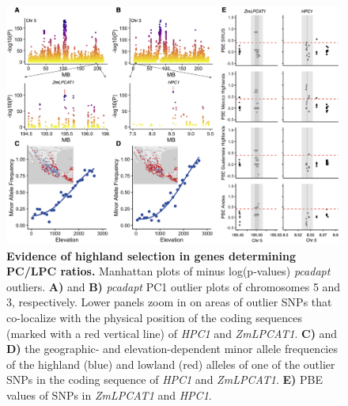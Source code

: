 \documentclass[9pt,twocolumn,twoside,lineno]{biorxiv}
\begin{document}
\begin{figure}[ht]
\begin{center}
\includegraphics[width=0.6\paperwidth]{Figures/Fig_2.png}
\caption{\textbf{Evidence of highland selection in genes determining PC/LPC ratios.}
Manhattan plots of minus log(p‐values) \textit{pcadapt} outliers. 
\textbf{A)} and \textbf{B)} \textit{pcadapt} PC1 outlier plots of chromosomes 5 and 3, respectively. 
Lower panels zoom in on areas of outlier SNPs that co-localize with the physical position of the coding sequences (marked with a red vertical line) of \textit{HPC1} and \textit{ZmLPCAT1}. 
\textbf{C)} and \textbf{D)} the geographic- and elevation-dependent minor allele frequencies of the highland (blue) and lowland (red) alleles of one of the outlier SNPs in the coding sequence of \textit{HPC1} and \textit{ZmLPCAT1}.
\textbf{E)} PBE values of SNPs in \textit{ZmLPCAT1} and \textit{HPC1}.} 
\label{Fig2}
\end{center}
\end{figure}
\end{document}
